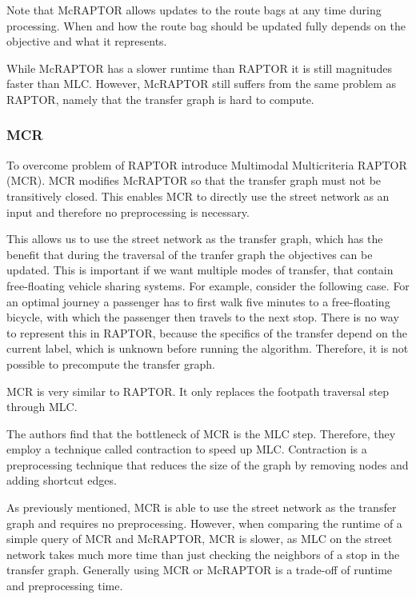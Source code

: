 Note that McRAPTOR allows updates to the route bags at any time during processing.
When and how the route bag should be updated fully depends on the objective and what it represents.

While McRAPTOR has a slower runtime than RAPTOR it is still magnitudes faster than MLC.
However, McRAPTOR still suffers from the same problem as RAPTOR, namely that the transfer graph is hard to compute.


\subsubsection{MCR}
\label{subsubsec:mcr}

To overcome problem of RAPTOR \cite{dellingComputingMultimodalJourneys2013} introduce Multimodal Multicriteria RAPTOR (MCR).
MCR modifies McRAPTOR so that the transfer graph must not be transitively closed.
This enables MCR to directly use the street network as an input and therefore no preprocessing is necessary.

This allows us to use the street network as the transfer graph, which has the benefit that during the traversal of the tranfer graph the objectives can be updated.
This is important if we want multiple modes of transfer, that contain free-floating vehicle sharing systems.
For example, consider the following case.
For an optimal journey a passenger has to first walk five minutes to a free-floating bicycle, with which the passenger then travels to the next stop.
There is no way to represent this in RAPTOR, because the specifics of the transfer depend on the current label, which is unknown before running the algorithm.
Therefore, it is not possible to precompute the transfer graph.

MCR is very similar to RAPTOR.
It only replaces the footpath traversal step through MLC.

The authors find that the bottleneck of MCR is the MLC step.
Therefore, they employ a technique called contraction  to speed up MLC.
Contraction is a preprocessing technique that reduces the size of the graph by removing nodes and adding shortcut edges.

As previously mentioned, MCR is able to use the street network as the transfer graph and requires no preprocessing.
However, when comparing the runtime of a simple query of MCR and McRAPTOR, MCR is slower, as MLC on the street network takes much more time than just checking the neighbors of a stop in the transfer graph.
Generally using MCR or McRAPTOR is a trade-off of runtime and preprocessing time.


